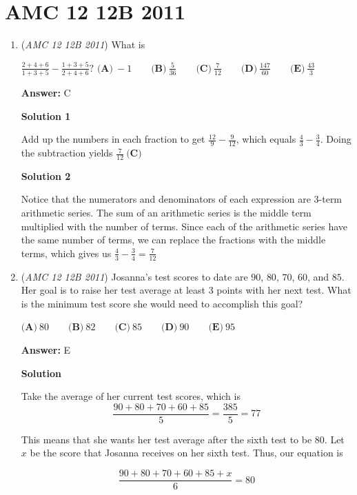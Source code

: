 \section{AMC 12 12B 2011}
        \begin{enumerate}
        	\item (\textit{AMC 12 12B 2011}) 
What is 

 $\frac{2+4+6}{1+3+5}-\frac{1+3+5}{2+4+6}?$
$\textbf{(A)}\ -1 \qquad \textbf{(B)}\ \frac{5}{36} \qquad \textbf{(C)}\ \frac{7}{12} \qquad \textbf{(D)}\ \frac{147}{60} \qquad \textbf{(E)}\ \frac{43}{3}$

 \textbf{Answer: }C



\textbf{Solution 1}

Add up the numbers in each fraction to get $\frac{12}{9} - \frac{9}{12}$, which equals $\frac{4}{3} - \frac{3}{4}$. Doing the subtraction yields $\boxed{\frac{7}{12}\   \textbf{(C)}}$




\textbf{Solution 2}

Notice that the numerators and denominators of each expression are 3-term arithmetic series. The sum of an arithmetic series is the middle term multiplied with the number of terms. Since each of the arithmetic series have the same number of terms, we can replace the fractions with the middle terms, which gives us $\frac{4}{3} - \frac{3}{4} = \frac{7}{12}$



	\item (\textit{AMC 12 12B 2011}) Josanna's test scores to date are $90$, $80$, $70$, $60$, and $85$.  Her goal is to raise her test average at least $3$ points with her next test.  What is the minimum test score she would need to accomplish this goal?


 $\textbf{(A)}\ 80 \qquad \textbf{(B)}\ 82 \qquad \textbf{(C)}\ 85 \qquad \textbf{(D)}\ 90 \qquad \textbf{(E)}\ 95$

 \textbf{Answer: }E



\textbf{Solution}

Take the average of her current test scores, which is
 \[\frac{90+80+70+60+85}{5} = \frac{385}{5} = 77\]

 This means that she wants her test average after the sixth test to be $80.$ Let $x$ be the score that Josanna receives on her sixth test. Thus, our equation is

 
 \[\frac{90+80+70+60+85+x}{6} = 80\]


\end{enumerate}
